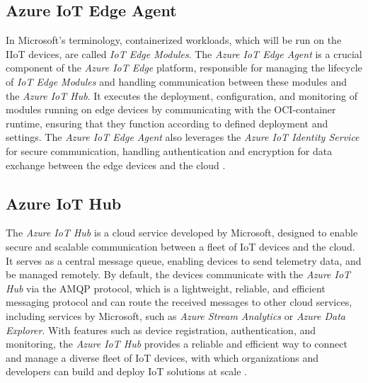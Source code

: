 \subsection{Azure IoT Edge Agent}
In Microsoft's terminology, containerized workloads, which will be run on the \ac{IIoT}
devices, are called \textit{IoT Edge Modules}.
The \textit{Azure IoT Edge Agent} is a crucial component of the \textit{Azure IoT Edge}
platform, responsible for managing the lifecycle of \textit{IoT Edge Modules} and
handling communication between these modules and the \textit{Azure IoT Hub}.
It executes the deployment, configuration, and monitoring of modules running on
edge devices by communicating with the \ac{OCI}-container runtime,
ensuring that they function according to defined deployment and settings.
The \textit{Azure IoT Edge Agent} also leverages the \textit{Azure IoT Identity Service}
for secure communication, handling authentication and encryption for data exchange
between the edge devices and the cloud \cite{msdoc-aziotedge-arch}.


\subsection{Azure IoT Hub}
The \textit{Azure IoT Hub} is a cloud service developed by Microsoft, designed to
enable secure and scalable communication between a fleet of \ac{IoT} devices and
the cloud. It serves as a central message queue, enabling devices to send telemetry
data, and be managed remotely. By default, the devices communicate with the
\textit{Azure IoT Hub}
via the \ac{AMQP} protocol, which is a lightweight, reliable, and efficient
messaging protocol and can route the received messages to other cloud services,
including services by Microsoft, such as \textit{Azure Stream Analytics} or
\textit{Azure Data Explorer}.
With features such as device registration,
authentication, and monitoring, the \textit{Azure IoT Hub} provides a reliable and efficient
way to connect and manage a diverse fleet of \ac{IoT} devices, with which
organizations and developers can build and deploy \ac{IoT} solutions at scale \cite{msdoc-aziothub}.

